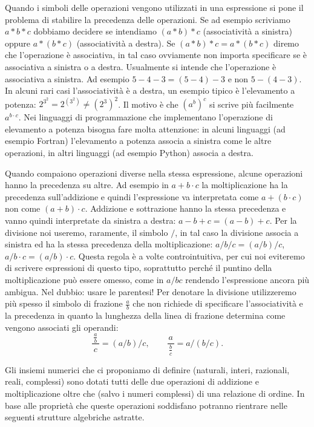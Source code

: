 Quando i simboli delle operazioni vengono utilizzati in una espressione si pone 
il problema di stabilire la precedenza delle operazioni.
Se ad esempio scriviamo $a*b*c$ dobbiamo decidere se intendiamo
$(a*b)*c$ (associatività a sinistra) oppure $a*(b*c)$ (associatività a destra).
Se $(a*b)*c=a*(b*c)$ diremo che l'operazione è associativa, in tal 
caso ovviamente non importa specificare se è associativa a sinistra o a destra.
Usualmente si intende che l'operazione è associativa a sinistra.
Ad esempio $5-4-3 = (5-4)-3$ e non $5-(4-3)$. 
In alcuni rari casi l'associatività è a destra, un esempio tipico è l'elevamento 
a potenza: $2^{3^2} = 2^{(3^2)} \neq (2^3)^2$.
Il motivo è che $(a^b)^c$ si scrive più facilmente $a^{b\cdot c}$.
Nei linguaggi di programmazione che implementano l'operazione di elevamento 
a potenza bisogna fare molta attenzione: in alcuni linguaggi (ad esempio Fortran) 
l'elevamento a potenza 
associa a sinistra come le altre operazioni, in altri linguaggi (ad esempio Python)
associa a destra.

Quando compaiono operazioni diverse nella stessa espressione, alcune operazioni 
hanno la precedenza su altre.
Ad esempio in $a+b\cdot c$ la moltiplicazione ha la precedenza sull'addizione
e quindi l'espressione va interpretata come $a+(b\cdot c)$ non come $(a+b)\cdot c$.
Addizione e sottrazione hanno la stessa precedenza e vanno quindi interpretate da sinistra a destra:
$a-b+c = (a-b)+c$. Per la divisione noi useremo, raramente, il simbolo $/$, 
in tal caso la divisione associa a sinistra ed ha la stessa precedenza della 
moltiplicazione: $a/b/c=(a/b)/c$, $a/b\cdot c=(a/b)\cdot c$.
Questa regola è a volte controintuitiva, per cui noi eviteremo di scrivere 
espressioni di questo tipo, soprattutto perché il puntino della moltiplicazione 
può essere omesso, come in $a/bc$ rendendo l'espressione ancora più ambigua.
Nel dubbio: usare le parentesi!
Per denotare la divisione utilizzeremo più spesso il simbolo di frazione $\frac a b$ che non richiede 
di specificare l'associatività e la precedenza in quanto la lunghezza della 
linea di frazione determina come vengono associati gli operandi: 
\[
  \frac{\,\frac a b\,}{c}=(a/b)/c, \qquad 
  \frac{a}{\,\frac bc\,}=a/(b/c).
\]  

Gli insiemi numerici che ci proponiamo di definire (naturali, interi, razionali, reali, complessi)
sono dotati tutti delle due operazioni di addizione e moltiplicazione
oltre che (salvo i numeri complessi) di una relazione di ordine.
In base alle proprietà che queste operazioni soddisfano potranno rientrare nelle 
seguenti strutture algebriche astratte. 

